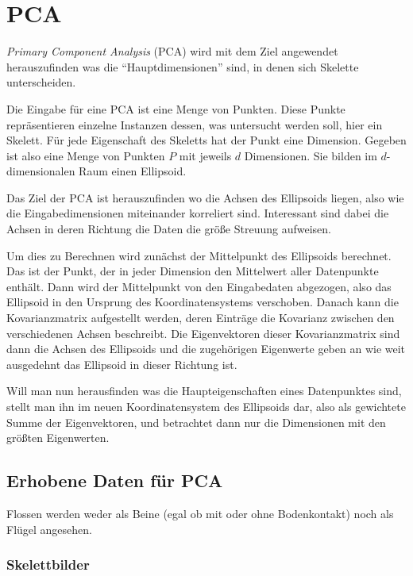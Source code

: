 \section{PCA}

 \emph{Primary Component Analysis} (PCA) wird mit dem Ziel angewendet herauszufinden was die "`Hauptdimensionen"' sind, in denen sich Skelette unterscheiden.
 
 Die Eingabe für eine PCA ist eine Menge von Punkten. Diese Punkte repräsentieren einzelne Instanzen dessen, was untersucht werden soll, hier ein Skelett. Für jede Eigenschaft des Skeletts hat der Punkt eine Dimension. Gegeben ist also eine Menge von Punkten $P$ mit jeweils $d$ Dimensionen. Sie bilden im $d$-dimensionalen Raum einen Ellipsoid.
 
 Das Ziel der PCA ist herauszufinden wo die Achsen des Ellipsoids liegen, also wie die Eingabedimensionen miteinander korreliert sind. Interessant sind dabei die Achsen in deren Richtung die Daten die größe Streuung aufweisen.
 
 Um dies zu Berechnen wird zunächst der Mittelpunkt des Ellipsoids berechnet. Das ist der Punkt, der in jeder Dimension den Mittelwert aller Datenpunkte enthält. Dann wird der Mittelpunkt von den Eingabedaten abgezogen, also das Ellipsoid in den Ursprung des Koordinatensystems verschoben. Danach kann die Kovarianzmatrix aufgestellt werden, deren Einträge die Kovarianz zwischen den verschiedenen Achsen beschreibt.
 Die Eigenvektoren dieser Kovarianzmatrix sind dann die Achsen des Ellipsoids und die zugehörigen Eigenwerte geben an wie weit ausgedehnt das Ellipsoid in dieser Richtung ist.
 
 Will man nun herausfinden was die Haupteigenschaften eines Datenpunktes sind, stellt man ihn im neuen Koordinatensystem des Ellipsoids dar, also als gewichtete Summe der Eigenvektoren, und betrachtet dann nur die Dimensionen mit den größten Eigenwerten.

 \subsection{Erhobene Daten für PCA}
 
 Flossen werden weder als Beine (egal ob mit oder ohne Bodenkontakt) noch als Flügel angesehen. 
 
 \subsubsection{Skelettbilder}
 
